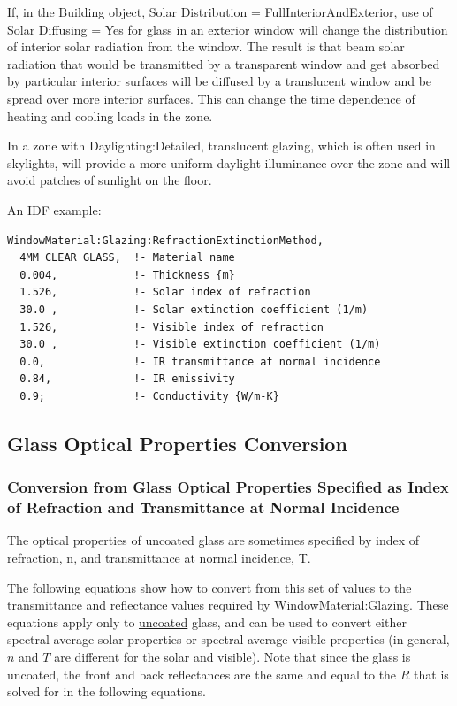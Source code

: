 If, in the Building object, Solar Distribution = FullInteriorAndExterior, use of Solar Diffusing = Yes for glass in an exterior window will change the distribution of interior solar radiation from the window. The result is that beam solar radiation that would be transmitted by a transparent window and get absorbed by particular interior surfaces will be diffused by a translucent window and be spread over more interior surfaces. This can change the time dependence of heating and cooling loads in the zone.

In a zone with Daylighting:Detailed, translucent glazing, which is often used in skylights, will provide a more uniform daylight illuminance over the zone and will avoid patches of sunlight on the floor.

An IDF example:

\begin{lstlisting}
WindowMaterial:Glazing:RefractionExtinctionMethod,
  4MM CLEAR GLASS,  !- Material name
  0.004,            !- Thickness {m}
  1.526,            !- Solar index of refraction
  30.0 ,            !- Solar extinction coefficient (1/m)
  1.526,            !- Visible index of refraction
  30.0 ,            !- Visible extinction coefficient (1/m)
  0.0,              !- IR transmittance at normal incidence
  0.84,             !- IR emissivity
  0.9;              !- Conductivity {W/m-K}
\end{lstlisting}

\subsection{Glass Optical Properties Conversion}\label{glass-optical-properties-conversion}

\subsubsection{Conversion from Glass Optical Properties Specified as Index of Refraction and Transmittance at Normal Incidence}\label{conversion-from-glass-optical-properties-specified-as-index-of-refraction-and-transmittance-at-normal-incidence}

The optical properties of uncoated glass are sometimes specified by index of refraction, n, and transmittance at normal incidence, T.

The following equations show how to convert from this set of values to the transmittance and reflectance values required by WindowMaterial:Glazing. These equations apply only to \underline{uncoated} glass, and can be used to convert either spectral-average solar properties or spectral-average visible properties (in general, \(n\) and \(T\) are different for the solar and visible). Note that since the glass is uncoated, the front and back reflectances are the same and equal to the \(R\) that is solved for in the following equations.

